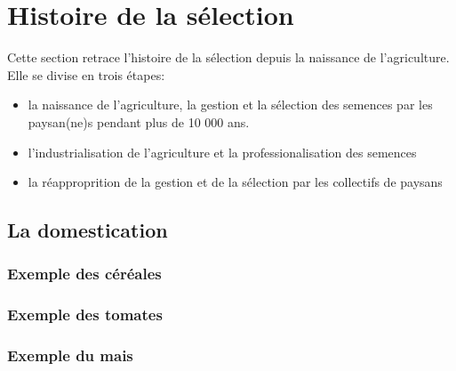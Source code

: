 \section{Histoire de la sélection}
Cette section retrace l'histoire de la sélection depuis la naissance de l'agriculture.
Elle se divise en trois étapes:
\begin{itemize}
\item la naissance de l'agriculture, la gestion et la sélection des semences par les paysan(ne)s pendant plus de 10 000 ans.
\item l'industrialisation de l'agriculture et la professionalisation des semences
\item la réapproprition de la gestion et de la sélection par les collectifs de paysans
\end{itemize}

\subsection{La domestication}

\subsubsection{Exemple des céréales}

\subsubsection{Exemple des tomates}

\subsubsection{Exemple du mais}


